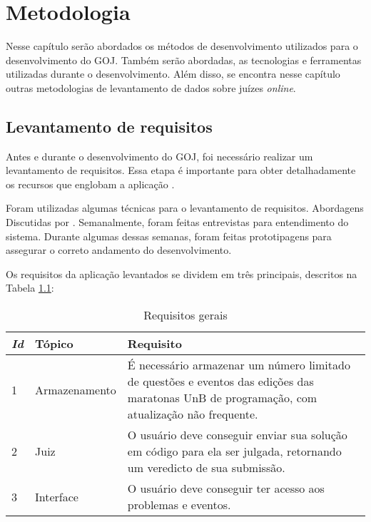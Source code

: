 \chapter{Metodologia}
\label{cap:metodologia}

Nesse capítulo serão abordados os métodos de desenvolvimento utilizados para o desenvolvimento do GOJ. Também serão abordadas, as tecnologias e ferramentas utilizadas durante o desenvolvimento. Além disso, se encontra nesse capítulo outras metodologias de levantamento de dados sobre juízes \textit{online}.

\section{Levantamento de requisitos}
\label{sec:levantamentoDeRequisitos}

Antes e durante o desenvolvimento do GOJ, foi necessário realizar um levantamento de requisitos. Essa etapa é importante para obter detalhadamente os recursos que englobam a aplicação \cite{young2002recommended}.

Foram utilizadas algumas técnicas para o levantamento de requisitos. Abordagens Discutidas por . Semanalmente, foram feitas entrevistas para entendimento do sistema. Durante algumas dessas semanas, foram feitas prototipagens para assegurar o correto andamento do desenvolvimento.

Os requisitos da aplicação levantados se dividem em três principais, descritos na Tabela \ref{table:reqGerais}:

\begin{table}[ht]
    \caption{Requisitos gerais}
    \centering
    \label{table:reqGerais}
    \begin{tabular}{ |p{0.5cm}|p{3cm}|p{10cm}|  }
        \hline
        
        \textit{\textbf{Id}} & 
        \textbf{Tópico} & 
        \textbf{Requisito} \\
        \hline
        
        1 & 
        Armazenamento   & 
        É necessário armazenar um número limitado de questões e eventos das edições das maratonas UnB de programação, com atualização não frequente.  \\
        \hline
        
        2 & 
        Juiz & 
        O usuário deve conseguir enviar sua solução em código para ela ser julgada, retornando um veredicto de sua submissão.  \\ 
        \hline
        
        3 & 
        Interface & 
        O usuário deve conseguir ter acesso aos problemas e eventos.  \\
        \hline
    \end{tabular}

\end{table}

